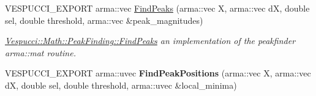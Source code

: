 \begin{DoxyCompactItemize}
\item 
V\+E\+S\+P\+U\+C\+C\+I\+\_\+\+E\+X\+P\+O\+RT arma\+::vec \hyperlink{namespace_vespucci_1_1_math_1_1_peak_finding_a3d5687d6ba8babb49689af636f28aae8}{Find\+Peaks} (arma\+::vec X, arma\+::vec dX, double sel, double threshold, arma\+::vec \&peak\+\_\+magnitudes)
\begin{DoxyCompactList}\small\item\em \hyperlink{namespace_vespucci_1_1_math_1_1_peak_finding_a3d5687d6ba8babb49689af636f28aae8}{Vespucci\+::\+Math\+::\+Peak\+Finding\+::\+Find\+Peaks} an implementation of the peakfinder arma\+::mat routine. \end{DoxyCompactList}\item 
V\+E\+S\+P\+U\+C\+C\+I\+\_\+\+E\+X\+P\+O\+RT arma\+::uvec {\bfseries Find\+Peak\+Positions} (arma\+::vec X, arma\+::vec dX, double sel, double threshold, arma\+::uvec \&local\+\_\+minima)\hypertarget{namespace_vespucci_1_1_math_1_1_peak_finding_a767c3537b74d0c61d6998204c3176b97}{}\label{namespace_vespucci_1_1_math_1_1_peak_finding_a767c3537b74d0c61d6998204c3176b97}


\end{DoxyCompactItemize}
